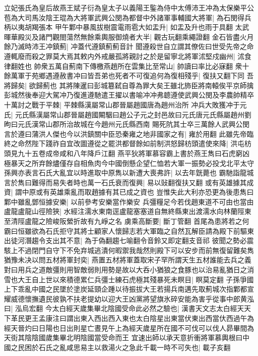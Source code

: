 立妃張氏為皇后故燕王斌子衍為皇太子以義陽王鍳為侍中太傅沛王冲為太保樂平公苞為大司馬汝陰王琨為大將軍武興公閔為都督中外諸軍事輔國大將軍|{
	為石閔得兵柄以夷胡羯張本}
甲午鄴中暴風拔樹震電雨雹大如盂升|{
	如盂及升也雨于具翻}
太武暉華殿災及諸門觀閤蕩然無餘乘輿服御燒者大半|{
	觀古玩翻乘繩證翻}
金石皆盡火月餘乃滅時沛王冲鎮薊|{
	冲蓋代遵鎮薊薊音計}
聞遵殺世自立謂其僚佐曰世受先帝之命遵輒廢而殺之罪莫大焉其敕内外戒嚴孤將親討之於是留寧北將軍沭堅戍幽州|{
	沭食律翻姓也}
帥衆五萬自薊南下傳檄燕趙所在雲集比至常山|{
	帥讀曰率比必寐翻}
衆十餘萬軍于苑鄉遇遵赦書冲曰皆吾弟也死者不可復追何為復相殘乎|{
	復扶又翻下同}
吾將歸矣|{
	欲歸薊也}
其將陳暹曰彭城簒弑自尊為罪大矣王雖北斾臣將南轅俟平京師擒彭城然後奉迎大駕冲乃復進遵馳遣王擢以書喻冲冲弗聼遵使武興公閔及李農帥精卒十萬討之戰于平棘|{
	平棘縣漢屬常山郡晉屬趙國唐為趙州治所}
冲兵大敗獲冲于元氏|{
	元氏縣漢屬常山郡晉屬趙國闞駰曰趙公子元之封邑故曰元氏唐元氏縣屬趙州劉昫曰元氏漢常山郡所治故城在今趙州元氏縣西南}
賜死阬其士卒三萬餘人武興公閔言於遵曰蒲洪人傑也今以洪鎮關中臣恐秦雍之地非國家之有|{
	雍於用翻}
此雖先帝臨終之命然陛下踐祚自宜改圖遵從之罷洪都督餘如前制洪怒歸枋頭遣使來降|{
	洪屯枋頭見九十五卷成帝咸和八年降戶江翻}
燕平狄將軍慕容霸上書於燕王雋曰石虎窮凶極暴天之所弃餘燼僅存自相魚肉今中國倒懸企望仁恤若大軍一振勢必投戈北平太守孫興亦表言石氏大亂宜以時進取中原雋以新遭大喪弗許|{
	以去年皝薨也}
霸馳詣龍城言於雋曰難得而易失者時也萬一石氏衰而復興|{
	易以䜴翻復扶又翻}
或有英雄據其成資|{
	謂中原或有英雄乘亂而取趙據有其已成之資也}
豈惟失此大利亦恐更為後患雋曰鄴中雖亂鄧恒據安樂|{
	以前參考安樂當作樂安}
兵彊糧足今若伐趙東道不可由也當由盧龍盧龍山徑險狹|{
	水經注濡水東南逕盧龍塞塞道自無終縣東出渡濡水向林蘭陘東至清陘盧龍之險峻阪縈折故有九崢之名}
虜乘高斷要|{
	斷丁管翻}
首尾為患將若之何霸曰恒雖欲為石氏拒守其將士顧家人懷歸志若大軍臨之自然瓦解臣請為殿下前驅東出徒河潛趨令支出其不意|{
	為于偽翻趨七喻翻令音鈴又即定翻支音祁}
彼聞之勢必震駭上不過閉門自守下不免弃城逃潰何暇禦我哉然則殿下可以安步而前無復留難矣雋猶豫未决以問五材將軍封奕|{
	燕置五材將軍蓋取宋子罕所謂天生五材誰能去兵之義}
對曰用兵之道敵彊則用智敵弱則用勢是故以大呑小猶狼之食豚也以治易亂猶日之消雪也大王自上世以來積德累仁兵彊士練石虎極其殘暴死未瞑目|{
	瞑莫定翻}
子孫爭國上下乖亂中國之民墜於塗炭延頸企踵以待振拔大王若揚兵南邁先取薊城次指鄴都宣耀威德懷撫遺民彼孰不扶老提幼以迎大王凶黨將望旗氷碎安能為害乎從事中郎黄泓曰|{
	泓烏宏翻}
今太白經天歲集畢北陰國受命此必然之驗也|{
	漢書天文志太白經天天下革民更王孟康注曰謂出東入西出西入東也太白陰星出東當伏東出西當㐲西過午為經天晉灼曰日陽也日出則星亡晝見午上為經天歲星所在國不可伐可以伐人昴畢間為天街其陰陰國歲集畢北明陰國當受命而王}
宜速出師以承天意折衝將軍慕輿根曰中國之民困於石氏之亂咸思易主以救湯火之急此千載一時不可失也|{
	載子亥翻}
